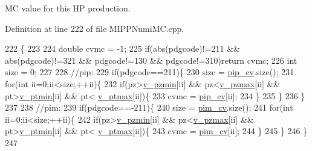 M\-C value for this H\-P production. 



Definition at line 222 of file M\-I\-P\-P\-Numi\-M\-C.\-cpp.


\begin{DoxyCode}
222                                                              \{
223  
224     \textcolor{keywordtype}{double} cvmc = -1;
225     \textcolor{keywordflow}{if}(abs(pdgcode)!=211 && abs(pdgcode)!=321 && pdgcode!=130 && pdgcode!=310)\textcolor{keywordflow}{return} cvmc;
226     \textcolor{keywordtype}{int} size = 0;
227    
228     \textcolor{comment}{//pip:}
229     \textcolor{keywordflow}{if}(pdgcode==211)\{
230       size = \hyperlink{class_neutrino_flux_reweight_1_1_m_i_p_p_numi_m_c_ad6ca50dd6ef1c900ff6f0b53858a13fe}{pip\_cv}.size();
231       \textcolor{keywordflow}{for}(\textcolor{keywordtype}{int} ii=0;ii<size;++ii)\{
232         \textcolor{keywordflow}{if}(pz>\hyperlink{class_neutrino_flux_reweight_1_1_m_i_p_p_numi_m_c_af6796ed5716ee06589ab1ba6e09fcd82}{v\_pzmin}[ii] && pz<\hyperlink{class_neutrino_flux_reweight_1_1_m_i_p_p_numi_m_c_ac4e9e478e2456cd112522650850b507c}{v\_pzmax}[ii] && pt>\hyperlink{class_neutrino_flux_reweight_1_1_m_i_p_p_numi_m_c_a105e858db8bf5e6b94a69b196815d98a}{v\_ptmin}[ii] && pt<
      \hyperlink{class_neutrino_flux_reweight_1_1_m_i_p_p_numi_m_c_afab2e17efd7d42565f3e1c8a84064349}{v\_ptmax}[ii])\{
233           cvmc = \hyperlink{class_neutrino_flux_reweight_1_1_m_i_p_p_numi_m_c_ad6ca50dd6ef1c900ff6f0b53858a13fe}{pip\_cv}[ii];
234         \}
235       \}      
236     \}
237 
238     \textcolor{comment}{//pim:}
239     \textcolor{keywordflow}{if}(pdgcode==-211)\{
240        size = \hyperlink{class_neutrino_flux_reweight_1_1_m_i_p_p_numi_m_c_a8aad49a86d53b5188e5287d850b9852d}{pim\_cv}.size();
241       \textcolor{keywordflow}{for}(\textcolor{keywordtype}{int} ii=0;ii<size;++ii)\{
242         \textcolor{keywordflow}{if}(pz>\hyperlink{class_neutrino_flux_reweight_1_1_m_i_p_p_numi_m_c_af6796ed5716ee06589ab1ba6e09fcd82}{v\_pzmin}[ii] && pz<\hyperlink{class_neutrino_flux_reweight_1_1_m_i_p_p_numi_m_c_ac4e9e478e2456cd112522650850b507c}{v\_pzmax}[ii] && pt>\hyperlink{class_neutrino_flux_reweight_1_1_m_i_p_p_numi_m_c_a105e858db8bf5e6b94a69b196815d98a}{v\_ptmin}[ii] && pt<
      \hyperlink{class_neutrino_flux_reweight_1_1_m_i_p_p_numi_m_c_afab2e17efd7d42565f3e1c8a84064349}{v\_ptmax}[ii])\{
243           cvmc = \hyperlink{class_neutrino_flux_reweight_1_1_m_i_p_p_numi_m_c_a8aad49a86d53b5188e5287d850b9852d}{pim\_cv}[ii];
244         \}
245       \}  
246     \}
247 

\end{DoxyCode}
